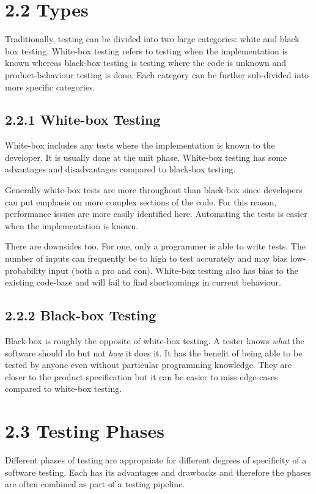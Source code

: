 \documentclass[12pt]{report}
\begin{document}
\section*{2.2 Types}

Traditionally, testing can be divided into two large categories: white and black box testing. White-box testing refers to testing when the implementation is known whereas black-box testing is testing where the code is unknown and product-behaviour testing is done. Each category can be further sub-divided into more specific categories.

\subsection*{2.2.1 White-box Testing}
\par\noindent
White-box includes any tests where the implementation is known to the developer. It is usually done at the unit phase. White-box testing has some advantages and disadvantages compared to black-box testing. 

\par\noindent
Generally white-box tests are more throughout than black-box since developers can put emphasis on more complex sections of the code. For this reason, performance issues are more easily identified here. Automating the tests is easier when the implementation is known.

\par\noindent
There are downsides too. For one, only a programmer is able to write tests. The number of inputs can frequently be to high to test accurately and may bias low-probability input (both a pro and con). White-box testing also has bias to the existing code-base and will fail to find shortcomings in current behaviour.


\subsection*{2.2.2 Black-box Testing}
\par\noindent
Black-box is roughly the opposite of white-box testing. A tester knows \textit{what} the software should do but not \textit{how} it does it. It has the benefit of being able to be tested by anyone even without particular programming knowledge. They are closer to the product specification but it can be easier to miss edge-cases compared to white-box testing.

\section*{2.3 Testing Phases}
\par\noindent
Different phases of testing are appropriate for different degrees of specificity of a software testing. Each has its advantages and drawbacks and therefore the phases are often combined as part of a testing pipeline.
\end{document}
